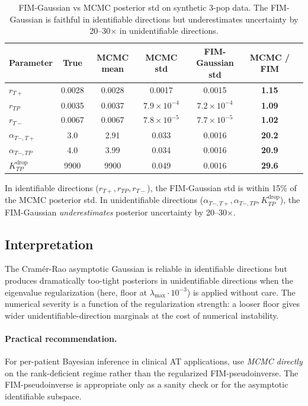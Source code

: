 \documentclass[11pt]{article}
\newcommand{\Kdrop}{K_{TP}^{\text{drop}}}
\newcommand{\Tplus}{T{+}}
\newcommand{\Tminus}{T{-}}
\begin{document}
\begin{table}[h]
\centering
\begin{tabular}{lcccccc}
\toprule
Parameter & True & MCMC mean & MCMC std & FIM-Gaussian std & MCMC / FIM \\
\midrule
$r_{\Tplus}$ & 0.0028 & 0.0028 & 0.0017 & 0.0015 & \textbf{1.15} \\
$r_{TP}$ & 0.0035 & 0.0037 & $7.9 \times 10^{-4}$ & $7.2 \times 10^{-4}$ & \textbf{1.09} \\
$r_{\Tminus}$ & 0.0067 & 0.0067 & $7.8 \times 10^{-5}$ & $7.7 \times 10^{-5}$ & \textbf{1.02} \\
$\alpha_{\Tminus,\Tplus}$ & 3.0 & 2.91 & 0.033 & 0.0016 & \textbf{20.2} \\
$\alpha_{\Tminus,TP}$ & 4.0 & 3.99 & 0.034 & 0.0016 & \textbf{20.9} \\
$\Kdrop$ & 9900 & 9900 & 0.049 & 0.0016 & \textbf{29.6} \\
\bottomrule
\end{tabular}
\caption{FIM-Gaussian vs MCMC posterior std on synthetic 3-pop data. The
FIM-Gaussian is faithful in identifiable directions but underestimates uncertainty
by 20--30$\times$ in unidentifiable directions.}
\end{table}

In identifiable directions ($r_{\Tplus}, r_{TP}, r_{\Tminus}$), the FIM-Gaussian
std is within 15\% of the MCMC posterior std. In unidentifiable directions
($\alpha_{\Tminus,\Tplus}, \alpha_{\Tminus,TP}, \Kdrop$), the FIM-Gaussian
\emph{underestimates} posterior uncertainty by 20--30$\times$.

\subsection{Interpretation}

The Cram\'er-Rao asymptotic Gaussian is reliable in identifiable directions but
produces dramatically too-tight posteriors in unidentifiable directions when the
eigenvalue regularization (here, floor at $\lambda_\text{max} \cdot 10^{-3}$) is
applied without care. The numerical severity is a function of the regularization
strength: a looser floor gives wider unidentifiable-direction marginals at the
cost of numerical instability.

\paragraph{Practical recommendation.} For per-patient Bayesian inference in
clinical AT applications, use \emph{MCMC directly} on the rank-deficient regime
rather than the regularized FIM-pseudoinverse. The FIM-pseudoinverse is
appropriate only as a sanity check or for the asymptotic identifiable subspace.
\end{document}
